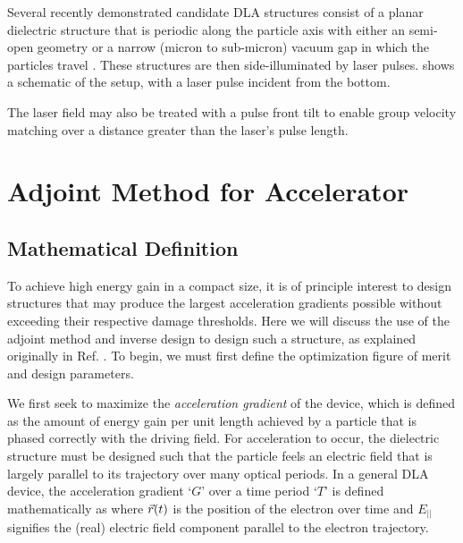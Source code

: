 Several recently demonstrated candidate DLA structures consist of a planar dielectric structure that is periodic along the particle axis with either an semi-open geometry or a narrow (micron to sub-micron) vacuum gap in which the particles travel \cite{plettner2006proposed, peralta2013demonstration, mcneur2016elements, leedle2015dielectric, chang2014silicon, breuer2014dielectric, breuer2014dielectric2, kozak2016dielectric}.
These structures are then side-illuminated by laser pulses.
 shows a schematic of the setup, with a laser pulse incident from the bottom.


The laser field may also be treated with a pulse front tilt \cite{hebling1996derivation, akturk2004pulse} to enable group velocity matching over a distance greater than the laser's pulse length.

\section{Adjoint Method for Accelerator}

\subsection{Mathematical Definition}

To achieve high energy gain in a compact size, it is of principle interest to design structures that may produce the largest acceleration gradients possible without exceeding their respective damage thresholds.
Here we will discuss the use of the adjoint method and inverse design to design such a structure, as explained originally in Ref. .
To begin, we must first define the optimization figure of merit and design parameters.

We first seek to maximize the \textit{acceleration gradient} of the device, which is defined as the amount of energy gain per unit length achieved by a particle that is phased correctly with the driving field.
For acceleration to occur, the dielectric structure must be designed such that the particle feels an electric field that is largely parallel to its trajectory over many optical periods.
In a general DLA device, the acceleration gradient `$G$' over a time period `$T$' is defined mathematically as
%
%
where $\vec{r}(t)$ is the position of the electron over time and $E_{||}$ signifies the (real) electric field component parallel to the electron trajectory.

